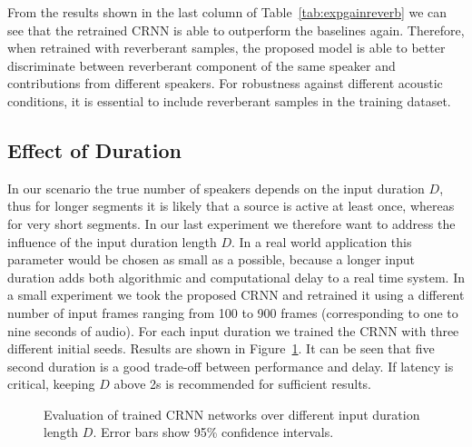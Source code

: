 From the results shown in the last column of Table~\ref{tab:expgainreverb} we can see that the retrained CRNN is able to outperform the baselines again.
Therefore, when retrained with reverberant samples, the proposed model is able to better discriminate between reverberant component of the same speaker and contributions from different speakers.
For robustness against different acoustic conditions, it is essential to include reverberant samples in the training dataset.

\subsection{Effect of Duration}%
\label{ssec:exp_duration}
In our scenario  the true number of speakers depends on the input duration \(D\), thus for longer segments it is likely that a source is active at least once, whereas for very short segments.
In our last experiment we therefore want to address the influence of the input duration length \(D\).
In a real world application this parameter would be chosen as small as a possible, because a longer input duration adds both algorithmic and computational delay to a real time system.
In a small experiment we took the proposed CRNN and retrained it using a different number of input frames ranging from 100 to 900 frames (corresponding to one to nine seconds of audio).
For each input duration we trained the CRNN with three different initial seeds.
Results are shown in Figure~\ref{fig:timesteps}.
It can be seen that five second duration is a good trade-off between performance and delay.
If latency is critical, keeping \(D\) above 2s is recommended for sufficient results.

\begin{figure}[h!]
    \centering
    \centering
    \begin{adjustbox}{width=0.8\columnwidth}
      
    \end{adjustbox}
    \caption{Evaluation of trained CRNN networks over different input duration length \(D\). Error bars show 95\% confidence intervals.}%
    \label{fig:timesteps}
 \end{figure}

